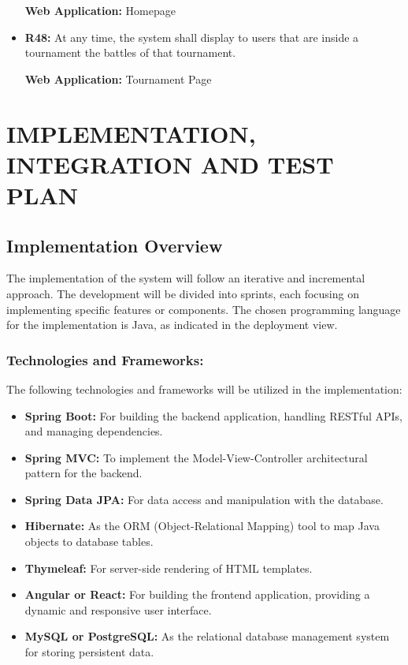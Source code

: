 \documentclass{article}
\begin{document}
\begin{itemize}
    \textbf{Web Application:} Homepage

    \item \textbf{R48:} At any time, the system shall display to users that are inside a tournament the battles of that tournament.
    
    \textbf{Web Application:} Tournament Page


\end{itemize}

\newpage

\section{IMPLEMENTATION, INTEGRATION AND TEST PLAN}

\subsection{Implementation Overview}

The implementation of the system will follow an iterative and incremental approach. The development will be divided into sprints, each focusing on implementing specific features or components. The chosen programming language for the implementation is Java, as indicated in the deployment view.

\subsubsection*{Technologies and Frameworks:}
The following technologies and frameworks will be utilized in the implementation:

\begin{itemize}
    \item \textbf{Spring Boot:} For building the backend application, handling RESTful APIs, and managing dependencies.
    \item \textbf{Spring MVC:} To implement the Model-View-Controller architectural pattern for the backend.
    \item \textbf{Spring Data JPA:} For data access and manipulation with the database.
    \item \textbf{Hibernate:} As the ORM (Object-Relational Mapping) tool to map Java objects to database tables.
    \item \textbf{Thymeleaf:} For server-side rendering of HTML templates.
    \item \textbf{Angular or React:} For building the frontend application, providing a dynamic and responsive user interface.
    \item \textbf{MySQL or PostgreSQL:} As the relational database management system for storing persistent data.
\end{itemize}
\end{document}
